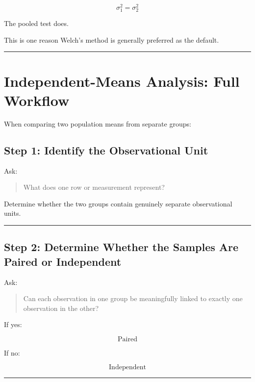 \documentclass[
  letterpaper,
  DIV=11,
  numbers=noendperiod]{scrreprt}
\begin{document}
\[
\sigma_1^2=\sigma_2^2
\]

The pooled test does.

This is one reason Welch's method is generally preferred as the default.

\begin{center}\rule{0.5\linewidth}{0.5pt}\end{center}


\chapter{Independent-Means Analysis: Full
Workflow}\label{independent-means-analysis-full-workflow}

When comparing two population means from separate groups:

\section{Step 1: Identify the Observational
Unit}\label{step-1-identify-the-observational-unit}

Ask:

\begin{quote}
What does one row or measurement represent?
\end{quote}

Determine whether the two groups contain genuinely separate
observational units.

\begin{center}\rule{0.5\linewidth}{0.5pt}\end{center}

\section{Step 2: Determine Whether the Samples Are Paired or
Independent}\label{step-2-determine-whether-the-samples-are-paired-or-independent}

Ask:

\begin{quote}
Can each observation in one group be meaningfully linked to exactly one
observation in the other?
\end{quote}

If yes:

\[
\text{Paired}
\]

If no:

\[
\text{Independent}
\]

\begin{center}\rule{0.5\linewidth}{0.5pt}\end{center}
\end{document}
